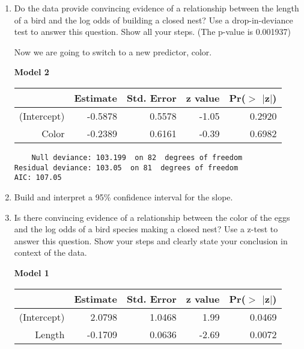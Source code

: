 \documentclass[11pt]{article}
\begin{document}
\begin{enumerate} 
\item Do the data provide convincing evidence of a relationship between the length of a bird and the log odds of building a closed nest? Use a drop-in-deviance test to answer this question. Show all your steps. (The p-value is 0.001937)


\newpage 

Now we are going to switch to a new predictor, color. 

\textbf{Model 2}

\begin{table}[ht]
\centering
\begin{tabular}{rrrrr}
  \hline
 & Estimate & Std. Error & z value & Pr($>$ $|$z$|$) \\ 
  \hline
(Intercept) & -0.5878 & 0.5578 & -1.05 & 0.2920 \\ 
  Color & -0.2389 & 0.6161 & -0.39 & 0.6982 \\ 
   \hline
\end{tabular}
\end{table}

\begin{verbatim}
    Null deviance: 103.199  on 82  degrees of freedom
Residual deviance: 103.05  on 81  degrees of freedom
AIC: 107.05
\end{verbatim}

\item Build and interpret a 95\% confidence interval for the slope. 

\vspace{5cm}

\item Is there convincing evidence of a relationship between the color of the eggs and the log odds of a bird species making a closed nest? Use a z-test to answer this question. Show your steps and clearly state your conclusion in context of the data. 


\newpage 

\textbf{Model 1} 

\begin{table}[ht]
\centering
\begin{tabular}{rrrrr}
  \hline
 & Estimate & Std. Error & z value & Pr($>$ $|$z$|$) \\ 
  \hline
(Intercept) & 2.0798 & 1.0468 & 1.99 & 0.0469 \\ 
  Length & -0.1709 & 0.0636 & -2.69 & 0.0072 \\ 
   \hline
\end{tabular}
\end{table}


\end{enumerate}
\end{document}
